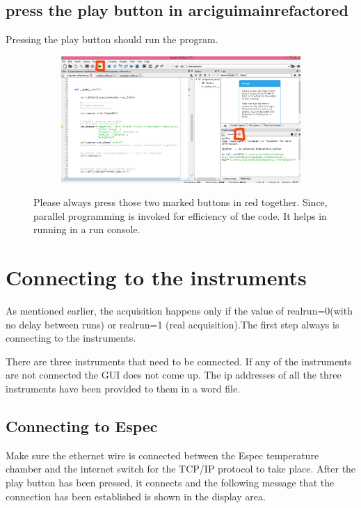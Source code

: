 \documentclass[12pt]{article}
\begin{document}
 
\subsection{ press the play button in \textbf{arciguimainrefactored}}
Pressing the play button should run the program. 
 
 \begin{figure}[H]
 
    \begin{subfigure}{1.0\textwidth}
    \includegraphics[scale=0.3]{images/playbutton.png} 
    \label{fig:DJp1}
    \end{subfigure}
 \caption{Please always press those two marked buttons in red together. Since, parallel programming is invoked for efficiency of the code. It helps in running in a run console.  }
\label{fig6}
\end{figure} 
 
 
 \section{Connecting to the instruments}
 As mentioned earlier, the acquisition  happens only if the value of realrun=0(with no delay between runs) or realrun=1 (real acquisition).The first step always is connecting to the instruments. 
 
 There are three instruments that need to be connected. If any of the instruments are not connected the GUI does not come up. The ip addresses of all the three instruments have been provided to them in a word file.  
 
 \subsection{Connecting to Espec}
 Make sure the ethernet wire is connected between the Espec temperature chamber and the internet switch for the TCP/IP protocol to take place. After the play button has been pressed, it connects and the following message that the connection has been established is shown in the display area. 
 
\end{document}
